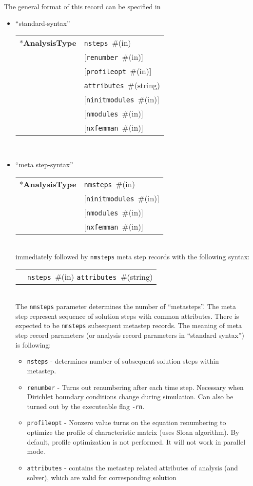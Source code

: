 \documentclass[a4paper]{article}
\newcommand{\param}[1]{\texttt{#1}} %
\newcommand{\optional}[1]{[#1]} %
\newcommand{\field}[2]{\param{#1}~\#{\tiny(#2)}} %
\newcommand{\optField}[2]{\optional{\field{#1}{#2}}}
\newcommand{\entKeyword}[1]{*\textbf{#1}} %
\newenvironment{record}[1][]{\begin{tabular}{|ll}}{\end{tabular}\\}
\newcommand{\recentry}[2]{{#1}&{#2}\\}
\newcounter{rcc}
\newenvironment{record}[1][\textwidth]{\setcounter{rcc}{0}\rowcolors{1}{lightgray}{lightgray}\tabularx{#1}{llR} \hline}
               {\endtabularx}
\newcommand{\recentry}[2]{\ifthenelse{\value{rcc}>0}{$\backslash$ \\}{\setcounter{rcc}{1}}{#1}&{#2}&}
\begin{document}
The general format of this record can be specified in
\begin{itemize}
\item ``standard-syntax''\\
  \begin{record}[0.9\textwidth]
    \recentry{\entKeyword{AnalysisType}}{\field{nsteps}{in}}
    \recentry{}{\optField{renumber}{in}}
    \recentry{}{\optField{profileopt}{in}}
    \recentry{}{\field{attributes}{string}}
    \recentry{}{\optField{ninitmodules}{in}}
    \recentry{}{\optField{nmodules}{in}}
    \recentry{}{\optField{nxfemman}{in}}
  \end{record}
\item ``meta step-syntax''\\
  \begin{record}[0.9\textwidth]
    \recentry{\entKeyword{AnalysisType}}{\field{nmsteps}{in}}
    \recentry{}{\optField{ninitmodules}{in}}
    \recentry{}{\optField{nmodules}{in}}
    \recentry{}{\optField{nxfemman}{in}}
  \end{record}
  immediately followed by \param{nmsteps} meta step records with the following syntax:\\
  \begin{record}[0.9\textwidth]
    \recentry{}{\field{nsteps}{in} \field{attributes}{string}}
  \end{record}
  The \param{nmsteps} parameter determines the number of ``metasteps''. The
meta step represent sequence of solution steps with common attributes.
There is expected to be \param{nmsteps} subsequent metastep records.
The meaning of meta step record parameters (or analysis record
parameters in ``standard syntax'') is following:
\begin{itemize}
\item \param{nsteps} - determines number of subsequent solution steps
within me\-ta\-step.
\item \param{renumber} - Turns out renumbering after each time step.
Necessary when Dirichlet boundary conditions change during simulation.
Can also be turned out by the executeable flag \texttt{-rn}.
\item \param{profileopt} - Nonzero value turns on the
equation renumbering to optimize the profile of characteristic matrix
(uses Sloan algorithm). By default, profile optimization is not
performed. It will not work in parallel mode.
\item \param{attributes} - contains the metastep related attributes of
analysis (and solver), which are valid for corresponding solution

\end{itemize}
\end{itemize}
\end{document}
